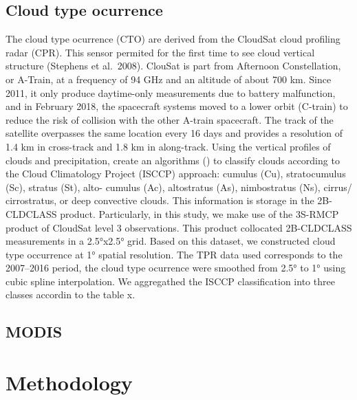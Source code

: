 \documentclass[a4paper, nobind]{templates/cdethesis}
\begin{document}
\hypertarget{cloud-type-ocurrence}{%
\subsection{Cloud type ocurrence}\label{cloud-type-ocurrence}}

The cloud type ocurrence (CTO) are derived from the CloudSat cloud profiling radar (CPR). This sensor permited for the first time to see cloud vertical structure (Stephens et al.~2008). ClouSat is part from Afternoon Constellation, or A-Train, at a frequency of 94 GHz and an altitude of about 700 km. Since 2011, it only produce daytime-only measurements due to battery malfunction, and in February 2018, the spacecraft systems moved to a lower orbit (C-train) to reduce the risk of collision with the other A-train spacecraft. The track of the satellite overpasses the same location every 16 days and provides a resolution of 1.4 km in cross-track and 1.8 km in along-track. Using the vertical profiles of clouds and precipitation, create an algorithms (\cite{}) to classify clouds according to the Cloud Climatology Project (ISCCP) approach: cumulus (Cu), stratocumulus (Sc), stratus (St), alto- cumulus (Ac), altostratus (As), nimbostratus (Ns), cirrus/ cirrostratus, or deep convective clouds. This information is storage in the 2B-CLDCLASS product. Particularly, in this study, we make use of the 3S-RMCP product of CloudSat level 3 observations. This product collocated 2B-CLDCLASS measurements in a 2.5°x2.5° grid. Based on this dataset, we constructed cloud type occurrence at 1° spatial
resolution. The TPR data used corresponds to the 2007--2016 period, the cloud type ocurrence were smoothed from 2.5° to 1° using cubic spline interpolation. We aggregathed the ISCCP classification into three classes accordin to the table x.

\hypertarget{modis}{%
\subsection{MODIS}\label{modis}}

\hypertarget{methodology}{%
\section{Methodology}\label{methodology}}
\end{document}
